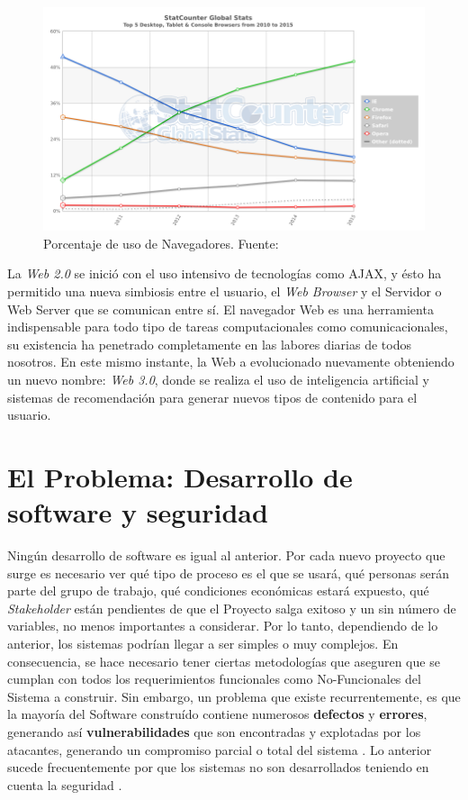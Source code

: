     \begin{figure}[h]
        \centering
        \includegraphics[width=1\textwidth]{figures/StatCounter-browser-ww-yearly-2010-2015.png}
        \caption{Porcentaje de uso de Navegadores. Fuente: \cite{statBrow}}
        \label{fig:UsageShare}
    \end{figure}

La \textit{Web 2.0} se inició con el uso intensivo de tecnologías como AJAX, y ésto ha permitido una nueva simbiosis entre el usuario, el \textit{Web Browser} y el Servidor o Web Server que se comunican entre sí. El navegador Web es una herramienta indispensable para todo tipo de tareas computacionales como comunicacionales, su existencia ha penetrado completamente en las labores diarias de todos nosotros. En este mismo instante, la Web a evolucionado nuevamente obteniendo un nuevo nombre: \textit{Web 3.0}, donde se realiza el uso de inteligencia artificial y sistemas de recomendación para generar nuevos tipos de contenido para el usuario.


\section{El Problema: Desarrollo de software y seguridad}
\label{chap1:SD_SS}

Ningún desarrollo de software es igual al anterior. Por cada nuevo proyecto que surge es necesario ver qué tipo de proceso es el que se usará, qué personas serán parte del grupo de trabajo, qué condiciones económicas estará expuesto, qué \textit{Stakeholder} están pendientes de que el Proyecto salga exitoso y un sin número de variables, no menos importantes a considerar. Por lo tanto, dependiendo de lo anterior, los sistemas podrían llegar a ser simples o muy complejos. En consecuencia, se hace necesario tener ciertas metodologías que aseguren que se cumplan con todos los requerimientos funcionales como No-Funcionales del Sistema a construir. Sin embargo, un problema que existe recurrentemente, es que la mayoría del Software construído contiene numerosos \textbf{defectos} y \textbf{errores}, generando así \textbf{vulnerabilidades} que son encontradas y explotadas por los atacantes, generando un compromiso parcial o total del sistema \cite{goertzel2007software}. Lo anterior sucede frecuentemente por que los sistemas no son desarrollados teniendo en cuenta la seguridad \cite{Yoder1998, fernandez2004methodology, WhyteHarrison}.

